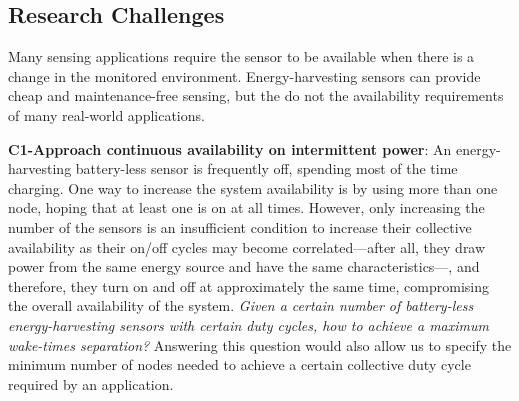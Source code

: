


\subsection{Research Challenges}

Many sensing applications require the sensor to be available when there is a change in the monitored environment.
Energy-harvesting sensors can provide cheap and maintenance-free sensing, but the do not the availability requirements of many real-world applications. 

\noindent\textbf{C1-Approach continuous availability on intermittent power}: 
An energy-harvesting battery-less sensor is frequently off, spending most of the time charging. 
One way to increase the system availability is by using more than one node, hoping that at least one is on at all times. However, only increasing the number of the sensors is an insufficient condition to increase their collective availability as their on/off cycles may become correlated---after all, they draw power from the same energy source and have the same characteristics---, and therefore, they turn on and off at approximately the same time, compromising the overall availability of the system. 
\textit{Given a certain number of battery-less energy-harvesting sensors with certain duty cycles, how to achieve a maximum wake-times separation?}
Answering this question would also allow us to specify the minimum number of nodes needed to achieve a certain collective duty cycle required by an application. 

